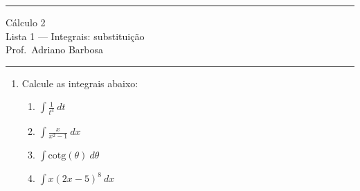 \documentclass{article}
\newcommand{\ds}{\displaystyle}
\begin{document}
\noindent{}\rule{\textwidth}{0.4pt}
\begin{center}
	C\'alculo 2\\
	Lista 1 --- Integrais: substitui\c{c}\~ao \\
	\vspace{0.2cm}
	Prof.\ Adriano Barbosa
\end{center}
\noindent{}\rule{\textwidth}{0.4pt}

\begin{enumerate}
	\item Calcule as integrais abaixo:
		\begin{enumerate}
			\item $\ds\int \frac{1}{t^4}\ dt$
			\item $\ds\int \frac{x}{x^2-1}\ dx$
			\item $\ds\int \mbox{cotg}(\theta)\ d\theta$
			\item $\ds\int x{(2x-5)}^8\ dx$
		\end{enumerate}
\end{enumerate}
\end{document}
